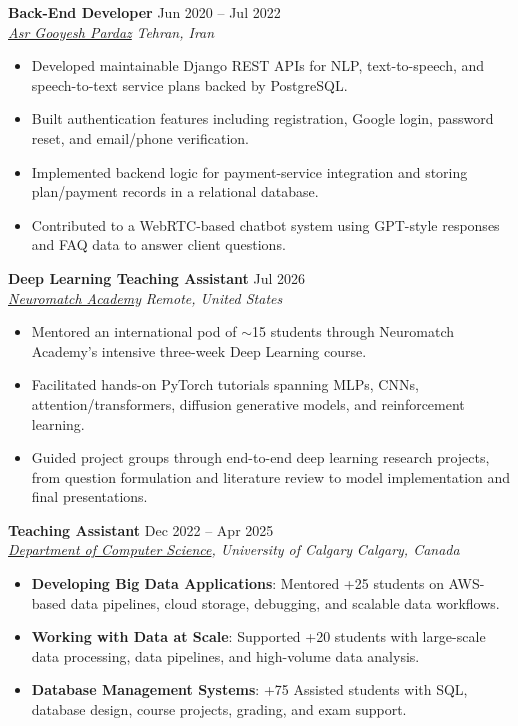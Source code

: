\documentclass[a4paper,10pt]{article}
\newcommand{\resumeSubheading}[4]{
    \textbf{#1} \hfill #2 \\
    \textit{#3} \hfill \textit{#4}
}
\begin{document}
\resumeSubheading
{Back-End Developer}
{Jun 2020 -- Jul 2022}
{\href{https://asr-gooyesh.com/en/}{Asr Gooyesh Pardaz}}
{Tehran, Iran}
\begin{itemize}[leftmargin=0.25in]
    \item Developed maintainable Django REST APIs for NLP, text-to-speech, and speech-to-text service plans backed by PostgreSQL.
    \item Built authentication features including registration, Google login, password reset, and email/phone verification.
    \item Implemented backend logic for payment-service integration and storing plan/payment records in a relational database.
    \item Contributed to a WebRTC-based chatbot system using GPT-style responses and FAQ data to answer client questions.
\end{itemize}

\resumeSubheading
{Deep Learning Teaching Assistant}
{Jul 2026}
{\href{https://neuromatch.io/}{Neuromatch Academy}}
{Remote, United States}
\begin{itemize}[leftmargin=0.25in]
    \item Mentored an international pod of $\sim$15 students through Neuromatch Academy's intensive three-week Deep Learning course.
    \item Facilitated hands-on PyTorch tutorials spanning MLPs, CNNs, attention/transformers, diffusion generative models, and reinforcement learning.
    \item Guided project groups through end-to-end deep learning research projects, from question formulation and literature review to model implementation and final presentations.
\end{itemize}

\resumeSubheading
{Teaching Assistant}
{Dec 2022 -- Apr 2025}
{\href{https://science.ucalgary.ca/computer-science} {Department of Computer Science}, University of Calgary}
{Calgary, Canada}
\begin{itemize}[leftmargin=0.25in]
    \item \textbf{Developing Big Data Applications}: Mentored +25 students on AWS-based data pipelines, cloud storage, debugging, and scalable data workflows. 
    \item \textbf{Working with Data at Scale}: Supported +20 students with large-scale data processing, data pipelines, and high-volume data analysis. 
    \item \textbf{Database Management Systems}: +75 Assisted students with SQL, database design, course projects, grading, and exam support.
\end{itemize}
\end{document}
